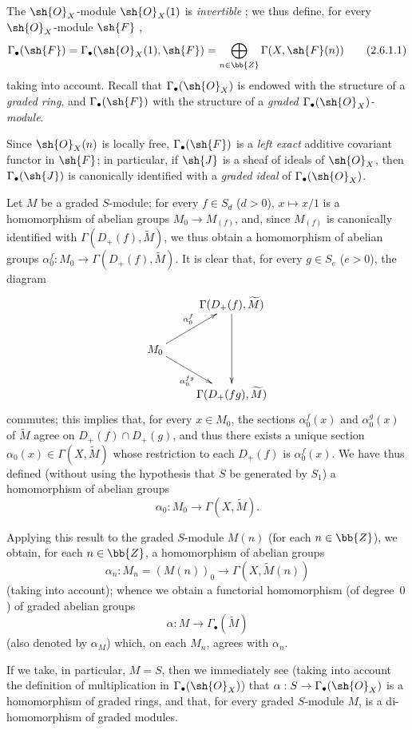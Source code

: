 \begin{env}[2.6.1]
\label{II.2.6.1}
The $\sh{O}_X$-module $\sh{O}_X(1)$ is \emph{invertible} ;
we thus define, for every $\sh{O}_X$-module $\sh{F}$ ,
\[
\label{II.2.6.1.1}
  \Gamma_\bullet(\sh{F})
  = \Gamma_\bullet(\sh{O}_X(1),\sh{F})
  = \bigoplus_{n\in\bb{Z}} \Gamma(X,\sh{F}(n))
\tag{2.6.1.1}
\]
taking  into account.
Recall  that $\Gamma_\bullet(\sh{O}_X)$ is endowed with the structure of a \emph{graded ring}, and $\Gamma_\bullet(\sh{F})$ with the structure of a \emph{graded $\Gamma_\bullet(\sh{O}_X)$-module}.

Since $\sh{O}_X(n)$ is locally free, $\Gamma_\bullet(\sh{F})$ is a \emph{left exact} additive covariant functor in $\sh{F}$;
in particular, if $\sh{J}$ is a sheaf of ideals of $\sh{O}_X$, then $\Gamma_\bullet(\sh{J})$ is canonically identified with a \emph{graded ideal} of $\Gamma_\bullet(\sh{O}_X)$.
\end{env}

\begin{env}[2.6.2]
\label{II.2.6.2}
Let $M$ be a graded $S$-module;
for every $f\in S_d$ ($d>0$), $x\mapsto x/1$ is a homomorphism of abelian groups $M_0\to M_{(f)}$, and, since $M_{(f)}$ is canonically identified
with $\Gamma(D_+(f),\widetilde{M})$, we thus obtain a homomorphism of abelian groups $\alpha_0^f: M_0\to\Gamma(D_+(f),\widetilde{M})$.
It is clear that, for every $g\in S_e$ ($e>0$), the diagram
\[
  \xymatrix{
    & \Gamma(D_+(f),\widetilde{M}) \ar[dd]
  \\M_0 \ar[ur]^{\alpha_0^f} \ar[dr]_{\alpha_0^{fg}}
  \\& \Gamma(D_+(fg),\widetilde{M})
  }
\]
commutes;
this implies that, for every $x\in M_0$, the sections $\alpha_0^f(x)$ and $\alpha_0^g(x)$ of $\widetilde{M}$ agree on $D_+(f)\cap D_+(g)$, and thus there exists a unique section $\alpha_0(x)\in\Gamma(X,\widetilde{M})$ whose restriction to each $D_+(f)$ is $\alpha_0^f(x)$.
We have thus defined (without using the hypothesis that $S$ be generated by $S_1$) a homomorphism of abelian groups
\[
\label{II.2.6.2.1}
  \alpha_0: M_0\to\Gamma(X,\widetilde{M}).
\tag{2.6.2.1}
\]

Applying this result to the graded $S$-module $M(n)$ (for each $n\in\bb{Z}$), we obtain, for each $n\in\bb{Z}$, a homomorphism of abelian groups
\[
\label{II.2.6.2.2}
  \alpha_n: M_n=(M(n))_0\to\Gamma(X,\widetilde{M}(n))
\tag{2.6.2.2}
\]
(taking  into account);
whence we obtain a functorial homomorphism (of degree~$0$) of graded abelian groups
\[
\label{II.2.6.2.3}
  \alpha: M\to\Gamma_\bullet(\widetilde{M})
\tag{2.6.2.3}
\]
(also denoted by $\alpha_M$) which, on each $M_n$, agrees with $\alpha_n$.

If we take, in particular, $M=S$, then we immediately see (taking into account the definition  of multiplication in $\Gamma_\bullet(\sh{O}_X)$) that $\alpha: S\to\Gamma_\bullet(\sh{O}_X)$ is a homomorphism of graded rings, and that, for every graded $S$-module $M$,  is a di-homomorphism of graded modules.
\end{env}


